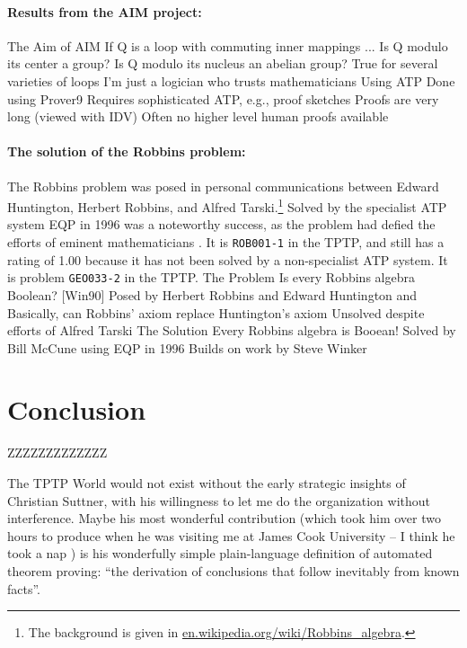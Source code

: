 \documentclass[runningheads]{llncs}
\begin{document}
\paragraph{Results from the AIM project:}
The Aim of AIM
If Q is a loop with commuting inner mappings ...
Is Q modulo its center a group?
Is Q modulo its nucleus an abelian group?
True for several varieties of loops
I'm just a logician who trusts mathematicians
Using ATP
Done using Prover9
Requires sophisticated ATP, e.g., proof sketches
Proofs are very long (viewed with IDV)
Often no higher level human proofs available

\paragraph{The solution of the Robbins problem:}
The Robbins problem was posed in personal communications between Edward Huntington,
Herbert Robbins, and Alfred Tarski.\footnote{%
The background is given in
\href{https://en.wikipedia.org/wiki/Robbins_algebra}{en.wikipedia.org/wiki/Robbins\_algebra}.}
Solved by the specialist ATP system EQP \cite{McC97}
in 1996 was a noteworthy success, as the problem had defied the efforts of eminent
mathematicians \cite{HMT71}.
It is {\tt ROB001-1} in the TPTP, and still has a rating of 1.00 because
it has not been solved by a non-specialist ATP system.
It is problem {\tt GEO033-2} in the TPTP.
The Problem
Is every Robbins algebra Boolean? [Win90]
Posed by Herbert Robbins and Edward Huntington and
Basically, can Robbins' axiom replace Huntington's axiom
Unsolved despite efforts of Alfred Tarski
The Solution
Every Robbins algebra is Booean!
Solved by Bill McCune using EQP in 1996
Builds on work by Steve Winker

\section{Conclusion}
\label{Conclusion}

ZZZZZZZZZZZZZ

The TPTP World would not exist without the early strategic insights of Christian Suttner,
with his willingness to let me do the organization without interference. 
Maybe his most wonderful contribution (which took him over two hours to produce when he
was visiting me at James Cook University -- I think he took a nap \smiley) is his 
wonderfully simple plain-language definition of automated theorem proving: 
``the derivation of conclusions that follow inevitably from known facts''.



\end{document}
